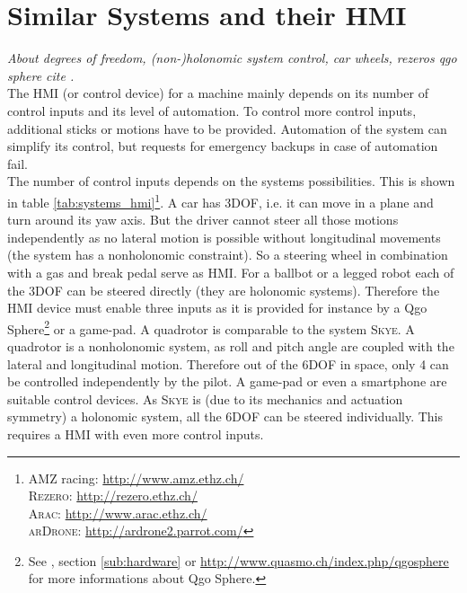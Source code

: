 \section{Similar Systems and their HMI}
\label{sec:similar systems}
\textit{About degrees of freedom, (non-)holonomic system control, car wheels, rezeros qgo sphere cite \cite{kammermann}.} \\
The HMI (or control device) for a machine mainly depends on its number of control inputs and its level of automation. To control more control inputs, additional sticks or motions have to be provided. Automation of the system can simplify its control, but requests for emergency backups in case of automation fail. \\
The number of control inputs depends on the systems possibilities. This is shown in table \ref{tab:systems_hmi}\footnote{\textsc{AMZ} racing: \url{http://www.amz.ethz.ch/} \\ \textsc{Rezero}: \url{http://rezero.ethz.ch/} \\ \textsc{Arac}: \url{http://www.arac.ethz.ch/} \\ \textsc{arDrone}: \url{http://ardrone2.parrot.com/}}. A car has 3DOF, i.e. it can move in a plane and turn around its yaw axis. But the driver cannot steer all those motions independently as no lateral motion is possible without longitudinal movements (the system has a nonholonomic constraint). So a steering wheel in combination with a gas and break pedal serve as HMI. For a ballbot or a legged robot each of the 3DOF can be steered directly (they are holonomic systems). Therefore the HMI device must enable three inputs as it is provided for instance by a Qgo Sphere\footnote{See \cite{kammermann}, section \ref{sub:hardware} or \url{http://www.quasmo.ch/index.php/qgosphere} for more informations about Qgo Sphere.} or a game-pad. A quadrotor is comparable to the system \textsc{Skye}. A quadrotor is a nonholonomic system, as roll and pitch angle are coupled with the lateral and longitudinal motion. Therefore out of the 6DOF in space, only 4 can be controlled independently by the pilot. A game-pad or even a smartphone are suitable control devices. As \textsc{Skye} is (due to its mechanics and actuation symmetry) a holonomic system, all the 6DOF can be steered individually. This requires a HMI with even more control inputs.
